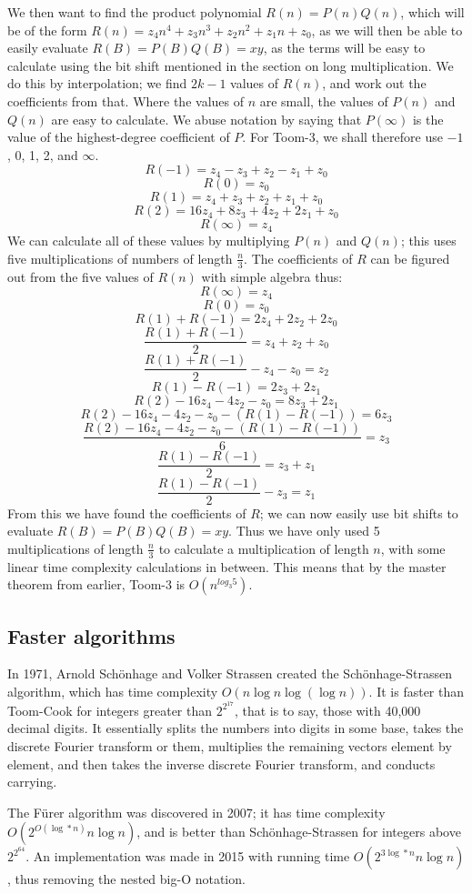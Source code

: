 \documentclass[12pt,a4paper]{report}
\begin{document}
\begin{multicols}{2}
\begin{multicols}{2}
We then want to find the product polynomial \(R(n)=P(n)Q(n)\), which will be of the form \(R(n)=z_4n^4+z_3n^3+z_2n^2+z_1n+z_0\), as we will then be able to easily evaluate \(R(B)=P(B)Q(B)=xy\), as the terms will be easy to calculate using the bit shift mentioned in the section on long multiplication. We do this by interpolation; we find \(2k-1\) values of \(R(n)\), and work out the coefficients from that. Where the values of \(n\) are small, the values of \(P(n)\) and \(Q(n)\) are easy to calculate. We abuse notation by saying that \(P(\infty)\) is the value of the highest-degree coefficient of \(P\). For Toom-3, we shall therefore use \(-1\), 0, 1, 2, and \(\infty\).
\[R(-1)=z_4-z_3+z_2-z_1+z_0\]
\[R(0)=z_0\]
\[R(1)=z_4+z_3+z_2+z_1+z_0\]
\[R(2)=16z_4+8z_3+4z_2+2z_1+z_0\]
\[R(\infty)=z_4\]
We can calculate all of these values by multiplying \(P(n)\) and \(Q(n)\); this uses five multiplications of numbers of length \(\frac{n}{3}\). The coefficients of \(R\) can be figured out from the five values of \(R(n)\) with simple algebra thus:
\[R(\infty)=z_4\]
\[R(0)=z_0\]
\[R(1)+R(-1)=2z_4+2z_2+2z_0\]
\[\frac{R(1)+R(-1)}{2}=z_4+z_2+z_0\]
\[\frac{R(1)+R(-1)}{2}-z_4-z_0=z_2\]
\[R(1)-R(-1)=2z_3+2z_1\]
\[R(2)-16z_4-4z_2-z_0=8z_3+2z_1\]
\[R(2)-16z_4-4z_2-z_0-(R(1)-R(-1))=6z_3\]
\[\frac{R(2)-16z_4-4z_2-z_0-(R(1)-R(-1))}{6}=z_3\]
\[\frac{R(1)-R(-1)}{2}=z_3+z_1\]
\[\frac{R(1)-R(-1)}{2}-z_3=z_1\]
From this we have found the coefficients of \(R\); we can now easily use bit shifts to evaluate \(R(B)=P(B)Q(B)=xy\). Thus we have only used 5 multiplications of length \(\frac{n}{3}\) to calculate a multiplication of length \(n\), with some linear time complexity calculations in between. This means that by the master theorem from earlier, Toom-3 is \(O(n^{log_{3}5})\).
\subsection{Faster algorithms}
In 1971, Arnold Sch\"onhage and Volker Strassen created the Sch\"onhage-Strassen algorithm, which has time complexity \(O(n\log{}n\log(\log{}n))\). It is faster than Toom-Cook for integers greater than \(2^{2^17}\), that is to say, those with 40,000 decimal digits. It essentially splits the numbers into digits in some base, takes the discrete Fourier transform or them, multiplies the remaining vectors element by element, and then takes the inverse discrete Fourier transform, and conducts carrying.

The F\"urer algorithm was discovered in 2007; it has time complexity \(O(2^{O(\log*n)}n\log{}n)\), and is better than Schönhage-Strassen for integers above \(2^{2^{64}}\). An implementation was made in 2015 with running time \(O(2^{3\log*n}n\log{}n)\), thus removing the nested big-O notation.

\end{multicols}
\end{multicols}
\end{document}

